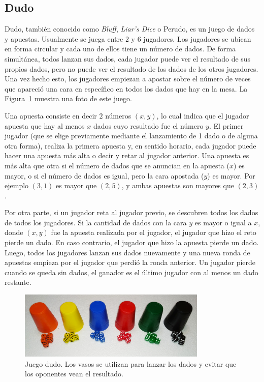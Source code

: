 \subsection*{Dudo}
Dudo, también conocido como \textit{Bluff}, \textit{Liar's Dice} o Perudo, es un juego de dados y apuestas. Usualmente se juega entre $2$ y $6$ jugadores. Los jugadores se ubican en forma circular y cada uno de ellos tiene un número de dados. De forma simultánea, todos lanzan sus dados, cada jugador puede ver el resultado de sus propios dados, pero no puede ver el resultado de los dados de los otros jugadores. Una vez hecho esto, los jugadores empiezan a apostar sobre el número de veces que apareció una cara en específico en todos los dados que hay en la mesa.  La Figura~\ref{fig:dudo} muestra una foto de este juego.

Una apuesta consiste en decir $2$ números $(x, y)$, lo cual indica que el jugador apuesta que hay al menos $x$ dados cuyo resultado fue el número $y$. El primer jugador (que se elige previamente mediante el lanzamiento de 1 dado o de alguna otra forma), realiza la primera apuesta y, en sentido horario, cada jugador puede hacer una apuesta más alta o decir  y retar al jugador anterior. Una apuesta es más alta que otra si el número de dados que se anuncian en la apuesta ($x$) es mayor, o si el número de dados es igual, pero la cara apostada ($y$) es mayor. Por ejemplo $(3, 1)$ es mayor que $(2, 5)$, y ambas apuestas son mayores que $(2, 3)$.

Por otra parte, si un jugador reta al jugador previo, se descubren todos los dados de todos los jugadores. Si la cantidad de dados con la cara $y$ es mayor o igual a $x$, donde $(x, y)$ fue la apuesta realizada por el jugador, el jugador que hizo el reto pierde un dado. En caso contrario, el jugador que hizo la apuesta pierde un dado. Luego, todos los jugadores lanzan sus dados nuevamente y una nueva ronda de apuestas empieza por el jugador que perdió la ronda anterior. Un jugador pierde cuando se queda sin dados, el ganador es el último jugador con al menos un dado restante.

\begin{figure}[t]
    \centering
    \includegraphics[width=0.8\textwidth]{figuras/dudo.jpg}
    \caption{Juego dudo. Los vasos se utilizan para lanzar los dados y evitar que los oponentes vean el resultado.}
    \label{fig:dudo}
\end{figure}


